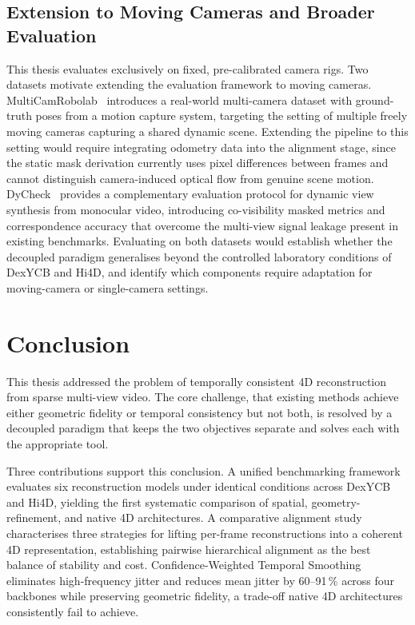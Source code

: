 \subsection{Extension to Moving Cameras and Broader Evaluation}
This thesis evaluates exclusively on fixed, pre-calibrated camera rigs. Two datasets
motivate extending the evaluation framework to moving cameras. MultiCamRobolab~\cite{multicamrobolab}
introduces a real-world multi-camera dataset with ground-truth poses from a motion
capture system, targeting the setting of multiple freely moving cameras capturing a
shared dynamic scene. Extending the pipeline to this setting would require integrating
odometry data into the alignment stage, since the static mask derivation currently uses
pixel differences between frames and cannot distinguish camera-induced optical flow from
genuine scene motion. DyCheck~\cite{dycheck} provides a complementary evaluation
protocol for dynamic view synthesis from monocular video, introducing co-visibility
masked metrics and correspondence accuracy that overcome the multi-view signal leakage
present in existing benchmarks. Evaluating on both datasets would establish whether the
decoupled paradigm generalises beyond the controlled laboratory conditions of DexYCB
and Hi4D, and identify which components require adaptation for moving-camera or
single-camera settings.

\section{Conclusion}
\label{sec:conclusion}

This thesis addressed the problem of temporally consistent 4D reconstruction from
sparse multi-view video. The core challenge, that existing methods achieve either
geometric fidelity or temporal consistency but not both, is resolved by a decoupled
paradigm that keeps the two objectives separate and solves each with the appropriate
tool.

Three contributions support this conclusion. A unified benchmarking framework evaluates
six reconstruction models under identical conditions across DexYCB and Hi4D, yielding
the first systematic comparison of spatial, geometry-refinement, and native 4D
architectures. A comparative alignment study characterises three strategies for lifting
per-frame reconstructions into a coherent 4D representation, establishing pairwise
hierarchical alignment as the best balance of stability and cost. Confidence-Weighted
Temporal Smoothing eliminates high-frequency jitter and reduces mean jitter by
60--91\,\% across four backbones while preserving geometric fidelity, a trade-off
native 4D architectures consistently fail to achieve.


